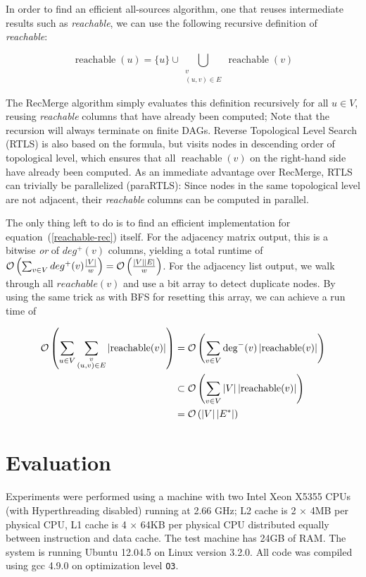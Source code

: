 \documentclass[12pt,a4paper,twoside]{article}
\DeclareMathOperator*{\reachable}{reachable}
\begin{document}
In order to find an efficient all-sources algorithm, \eg one that reuses intermediate results such as \emph{reachable}, we can use the following recursive definition of \emph{reachable}:

\begin{equation}
  \reachable(u) = \{u\} \cup \bigcup_{\substack{v \\ (u, v) \in E}} \reachable(v)
  \label{reachable-rec}
\end{equation}

The RecMerge algorithm simply evaluates this definition recursively for all $u \in V$, reusing \emph{reachable} columns that have already been computed; Note that the recursion will always terminate on finite DAGs. Reverse Topological Level Search (RTLS) is also based on the formula, but visits nodes in descending order of topological level, which ensures that all $\reachable(v)$ on the right-hand side have already been computed. As an immediate advantage over RecMerge, RTLS can trivially be parallelized (paraRTLS): Since nodes in the same topological level are not adjacent, their \emph{reachable} columns can be computed in parallel.

The only thing left to do is to find an efficient implementation for equation~(\ref{reachable-rec}) itself. For the adjacency matrix output, this is a bitwise \emph{or} of $deg^+(v)$ columns, yielding a total runtime of $\mathcal{O}\left(\sum_{v \in V} deg^+(v) \frac{\left|V\right|}{w}\right) = \mathcal{O}\left(\frac{\left|V\right| \left|E\right|}{w}\right)$. For the adjacency list output, we walk through all $reachable(v)$ and use a bit array to detect duplicate nodes. By using the same trick as with BFS for resetting this array, we can achieve a run time of

\begin{align*}
\BigOh{\sum_{u \in V} \sum_{\substack{v \\ (u, v) \in E}} \abs{\reachable(v)}}
&= \BigOh{\sum_{v \in V} \deg^-(v) \abs{\reachable(v)}} \\
&\subset \BigOh{\sum_{v \in V} \abs{V} \abs{\reachable(v)}} \\
&= \BigOh{\abs{V} \abs{E^*}}
\end{align*}

\section{Evaluation}

Experiments were performed using a machine with two Intel Xeon X5355 CPUs (with Hyperthreading disabled) running at 2.66 GHz; L2 cache is 2 $\times$ 4MB per physical CPU, L1 cache is 4 $\times$ 64KB per physical CPU distributed equally between instruction and data cache. The test machine has 24GB of RAM.
The system is running Ubuntu 12.04.5 on Linux version 3.2.0. All code was compiled using gcc 4.9.0 on optimization level \texttt{O3}.
\end{document}
